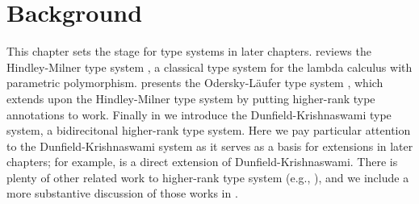 \chapter{Background}
\label{chap:Background}

This chapter sets the stage for type systems in later chapters. 
reviews the Hindley-Milner type system \citep{Damas:Milner,hindley,milner}, a
classical type system for the lambda calculus with parametric polymorphism.
 presents the Odersky-L{\"a}ufer type system
\citep{odersky:putting}, which extends upon the Hindley-Milner type system by
putting higher-rank type annotations to work. Finally in  we
introduce the Dunfield-Krishnaswami type system, a bidirecitonal higher-rank
type system. Here we pay particular attention to the Dunfield-Krishnaswami
system as it serves as a basis for extensions in later chapters; for example,
 is a direct extension of Dunfield-Krishnaswami. There is
plenty of other related work to higher-rank type system (e.g.,
\cite{practical:inference}), and we include a more substantive discussion of
those works in .







